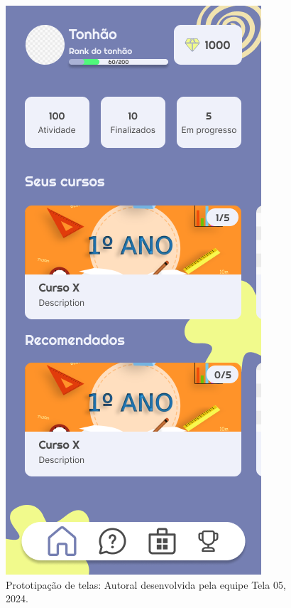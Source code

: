 \documentclass[12pt, openany, oneside, a4paper, english, brazil]{abntex2}   %
\begin{document}
\begin{figure}
    \centering
    \includegraphics[scale=0.7]{figuras/Math.Pow App/Home Alternative BG.png}
    \caption{Prototipação de telas: Autoral desenvolvida pela equipe Tela 05, 2024.}
    \label{fig:nome-da-imagem}
\end{figure}
\end{document}
